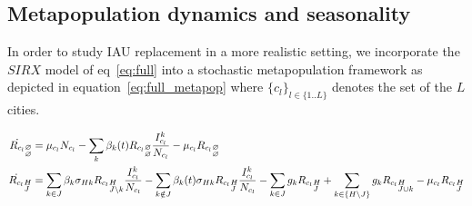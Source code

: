 \subsection{Metapopulation dynamics and seasonality}

In order to study IAU replacement in a more realistic setting, we
incorporate the $SIRX$ model of eq~\eqref{eq:full} into a stochastic
metapopulation framework as depicted in
equation~\eqref{eq:full_metapop} where $\{c_l\}_{l\in\{1..L\}}$
denotes the set of the $L$ cities.

\begin{footnotesize}
  \begin{align}
    \label{eq:full_metapop}
    \dot{R_{c_l}}_{\begin{subarray}{l}\varnothing \\ \varnothing \end{subarray}} &= \mu_{c_l} N_{c_l} -\sum_k \beta_k(t) {R_{c_l}}_{\begin{subarray}{l}\varnothing \\ \varnothing \end{subarray}} \frac{I_{c_l}^k}{N_{c_l}} - \mu_{c_l} {R_{c_l}}_{\begin{subarray}{l}\varnothing \\ \varnothing \end{subarray}}\\
    \dot{R_{c_l}}_{\begin{subarray}{l}H\\ J \end{subarray}} &= \sum_{k
      \in J} \beta_k \sigma_{Hk} {R_{c_l}}_{\begin{subarray}{l}H \\ J
        \setminus k \end{subarray}} \frac{I_{c_l}^k}{N_{c_l}} -\sum_{k
      \notin J} \beta_k(t) \sigma_{Hk}
    {R_{c_l}}_{\begin{subarray}{l}H\\ J \end{subarray}}
    \frac{I_{c_l}^k}{N_{c_l}} - \sum_{k \in J} g_k
    {R_{c_l}}_{\begin{subarray}{l}H\\ J \end{subarray}} + \sum_{k \in
      \{H \setminus J\}} g_k {R_{c_l}}_{\begin{subarray}{l}H\\ J\cup
        k \end{subarray}} -\mu_{c_l}
    {R_{c_l}}_{\begin{subarray}{l}H\\J \end{subarray}} \notag \\

\end{align}
\end{footnotesize}

